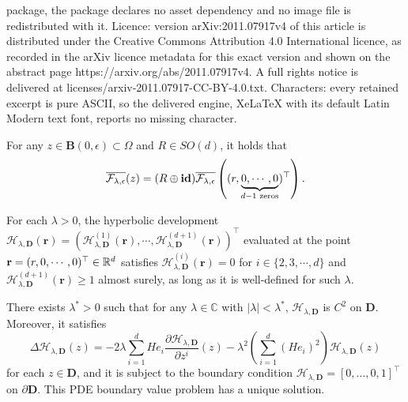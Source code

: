 \documentclass[10pt,a4paper]{amsart}
\newcommand{\B}{\mathbf{B}}
\newcommand{\C}{\mathbb{C}}
\newcommand{\e}{\epsilon}
\begin{document}
package, the package declares no asset dependency and no image file is redistributed with it. Licence: version arXiv:2011.07917v4 of this article is distributed under the Creative Commons Attribution 4.0 International licence, as recorded in the arXiv licence metadata for this exact version and shown on the abstract page https://arxiv.org/abs/2011.07917v4. A full rights notice is delivered at licenses/arxiv-2011.07917-CC-BY-4.0.txt. Characters: every retained excerpt is pure ASCII, so the delivered engine, XeLaTeX with its default Latin Modern text font, reports no missing character.
\begin{lemma}\label{Lemma_F_bar}
For any $z \in \B(0,\e) \subset \Omega$ and $R \in SO(d)$, it holds that
\begin{equation}\label{eqn_F_bar}
\overline{\mathcal{F}_{\lambda,\e}}(z) =
(R \oplus {\bf id})   \overline{{\mathcal{F}}_{\lambda,\e}}\left( (r, \underbrace{0, \cdots, 0}_{d-1 \text{ zeros}})^{\top}\right).
\end{equation}
\end{lemma}

\begin{lemma}\label{lem: sparseness}
For each $\lambda >0$, the hyperbolic development $\mathcal{H}_{\lambda, \mathbf{D}}\left(\mathbf{r}\right) = \left (\mathcal{H}^{(1)}_{\lambda, \mathbf{D}}(\mathbf{r}), \cdots, \mathcal{H}^{(d+1)}_{\lambda, \mathbf{D}}(\mathbf{r})\right )^{\top}$ evaluated at the point ${\bf r}=(r,0,\cdots,0)^\top\in \mathbb{R}^{d}$ satisfies $\mathcal{H}^{(i)}_{\lambda, \mathbf{D}}(\mathbf{r})=0$ for $i \in \{2, 3, \cdots, d\}$ and $\mathcal{H}^{(d+1)}_{\lambda, \mathbf{D}}(\mathbf{r}) \geq 1$ almost surely, as long as it is well-defined for such $\lambda$.
\end{lemma}

\begin{lemma}\label{lem: PDE_H_d_ball}
There exists $\lambda^* >0$ such that for any $\lambda \in \C$ with $|\lambda| < \lambda^*$, $\mathcal{H}_{\lambda, \mathbf{D}}$ is $C^2$ on $\mathbf{D}$. Moreover, it satisfies
\begin{equation*}
\Delta \mathcal{H}_{\lambda, \mathbf{D}}(z)=-2\lambda\sum_{i=1}^{d}He_{i}\frac{\partial \mathcal{H}_{\lambda, \mathbf{D}}}{\partial z^{i}}(z)-\lambda^{2}\left(\sum_{i=1}^{d}\left(He_{i}\right)^{2}\right)\mathcal{H}_{\lambda, \mathbf{D}}(z)
\end{equation*}
for each $z \in \mathbf{D}$, and it is subject to the boundary condition $\mathcal{H}_{\lambda, \mathbf{D}} = [0,\ldots, 0, 1]^{\top}$ on $\partial \mathbf{D}$. This PDE boundary value problem has a unique solution.
\end{lemma}
\end{document}
